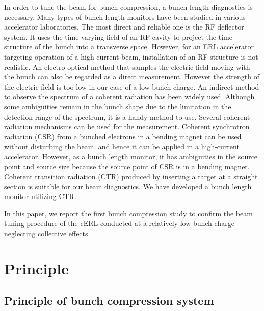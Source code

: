 \documentclass[review]{elsarticle}
\begin{document}
In order to tune the beam for bunch compression,
a bunch length diagnostics is necessary.
Many types of bunch length monitors have been studied 
in various accelerator laboratories.
The most direct and reliable one is the RF deflector system.
It uses the time-varying field of an RF cavity 
to project the time structure of the bunch into a transverse space.
However, for an ERL accelerator targeting operation of a high current beam,
installation of an RF structure is not realistic.
An electro-optical method
that samples the electric field moving with the bunch
can also be regarded as a direct measurement.
However the strength of the electric field 
is too low in our case of a low bunch charge.
An indirect method to observe the spectrum of a coherent radiation
has been widely used.
Although some ambiguities remain
in the bunch shape
due to the limitation in the detection range of the spectrum,
it is a handy method to use. 
Several coherent radiation mechanisms can be used for the measurement.
Coherent synchrotron radiation (CSR) from 
a bunched electrons in a bending magnet
can be used without disturbing the beam, 
and hence it can be applied in a high-current accelerator.
However, 
as a bunch length monitor,
it has ambiguities in the source point and source size
because the source point of CSR is in a bending magnet.
Coherent transition radiation (CTR) produced
by inserting a target at a straight section
is suitable for our beam diagnostics.
We have developed a bunch length monitor utilizing CTR.

In this paper,
we report the first bunch compression study
to confirm the beam tuning procedure of the cERL
conducted at a relatively low bunch charge
neglecting collective effects.


\section{Principle}

\subsection{Principle of bunch compression system}
\label{sec:principle}
\end{document}
